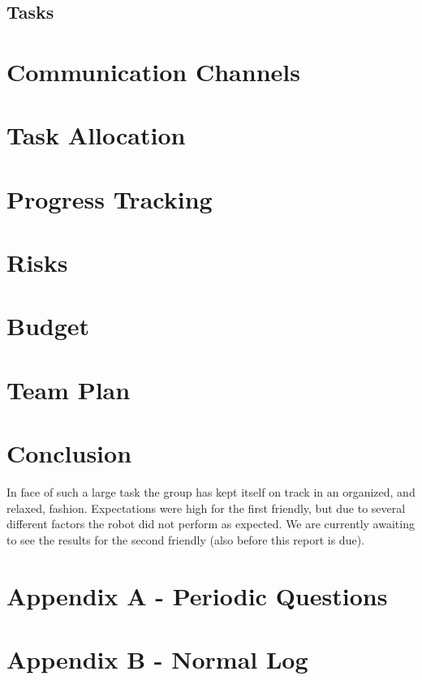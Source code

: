 \documentclass[a4paper,12pt]{article}
\begin{document}
\subsection{Tasks}


\section{Communication Channels}


\section{Task Allocation}


\section{Progress Tracking}


\section{Risks}

\section{Budget}

\section{Team Plan}


\section{Conclusion}
In face of such a large task the group has kept itself on track in an organized, and relaxed, fashion. Expectations were high for the first friendly, but due to several different factors the robot did not perform as expected. We are currently awaiting to see the results for the second friendly (also before this report is due).

\newpage
\section*{Appendix A - Periodic Questions}
\begin{figure}[H]
    \centering
    
    \label{fig:andralog}
\end{figure}
\newpage
\section*{Appendix B - Normal Log}
\begin{figure}[H]
    \centering
    
    \label{fig:veskolog}
\end{figure}
\end{document}
